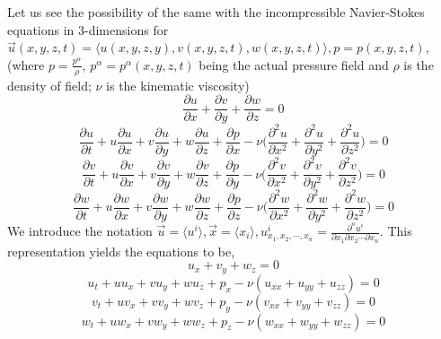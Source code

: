 \documentclass{article}
\begin{document}
Let us see the possibility of the same with the incompressible Navier-Stokes equations in 3-dimensions for $\vec{u}(x,y,z,t) = \langle u(x,y,z,y), v(x,y,z,t), w(x,y,z,t) \rangle, p = p(x,y,z,t)$, (where $p = \frac{p^{\alpha}}{\rho}$, $p^{\alpha} = p^{\alpha}(x,y,z,t)$ being the actual pressure field and $\rho$ is the density of field; $\nu$ is the kinematic viscosity)
\begin{equation} \label{eqn1}
\frac{\partial u}{\partial x} + \frac{\partial v}{\partial y} + \frac{\partial w}{\partial z} = 0
\end{equation}
\begin{equation} \label{eqn2}
\frac{\partial u}{\partial t} + u \frac{\partial u}{\partial x} + v \frac{\partial u}{\partial y} + w \frac{\partial u}{\partial z} + \frac{\partial p}{\partial x} - \nu \bigg(\frac{\partial^2 u}{\partial x^2} +\frac{\partial^2 u}{\partial y^2}+\frac{\partial^2 u}{\partial z^2}\bigg) = 0
\end{equation}
\begin{equation} \label{eqn3}
\frac{\partial v}{\partial t} + u \frac{\partial v}{\partial x} + v \frac{\partial v}{\partial y} + w \frac{\partial v}{\partial z} + \frac{\partial p}{\partial y} - \nu \bigg(\frac{\partial^2 v}{\partial x^2} +\frac{\partial^2 v}{\partial y^2}+\frac{\partial^2 v}{\partial z^2}\bigg) = 0
\end{equation}
\begin{equation} \label{eqn4}
\frac{\partial w}{\partial t} + u \frac{\partial w}{\partial x} + v \frac{\partial w}{\partial y} + w \frac{\partial w}{\partial z} + \frac{\partial p}{\partial z} - \nu \bigg(\frac{\partial^2 w}{\partial x^2} +\frac{\partial^2 w}{\partial y^2}+\frac{\partial^2 w}{\partial z^2}\bigg) = 0
\end{equation}
We introduce the notation $\vec{u}=\langle u^i \rangle, \vec{x} = \langle x_i \rangle, u^{i}_{x_1,x_2, \cdots, x_n} = \frac{\partial^n u^i}{\partial x_1 \partial x_2 \cdots \partial x_n}$. This representation yields the equations to be,
\begin{equation*}
u_x + v_y + w_z = 0
\end{equation*}
\begin{equation*}
u_t + u u_x + v u_y + w u_z + p_x - \nu (u_{xx} + u_{yy} + u_{zz}) = 0
\end{equation*}
\begin{equation*}
v_t + u v_x + v v_y + w v_z + p_y - \nu (v_{xx} + v_{yy} + v_{zz}) = 0
\end{equation*}
\begin{equation*}
w_t + u w_x + v w_y + w w_z + p_z - \nu (w_{xx} + w_{yy} + w_{zz}) = 0
\end{equation*}
\end{document}
